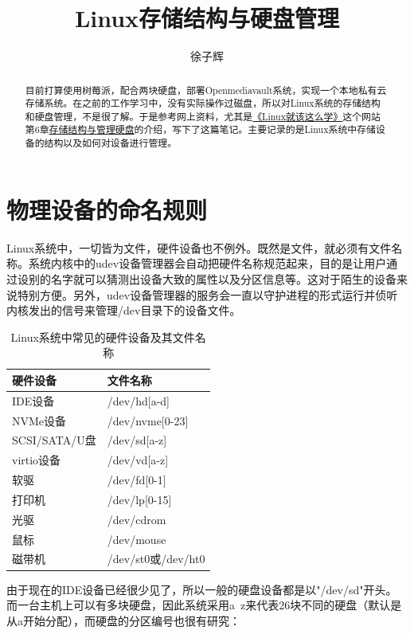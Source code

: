 \documentclass[UTF8]{article}
\title{Linux存储结构与硬盘管理}
\author{徐子辉}
\begin{document}
	\maketitle
	
	\begin{abstract}
		目前打算使用树莓派，配合两块硬盘，部署Openmediavault系统，实现一个本地私有云存储系统。在之前的工作学习中，没有实际操作过磁盘，所以对Linux系统的存储结构和硬盘管理，不是很了解。于是参考网上资料，尤其是\href{https://www.linuxprobe.com/}{《Linux就该这么学》}这个网站第6章\href{https://www.linuxprobe.com/basic-learning-06.html}{存储结构与管理硬盘}的介绍，写下了这篇笔记。主要记录的是Linux系统中存储设备的结构以及如何对设备进行管理。
	\end{abstract}
	
	
	\section{物理设备的命名规则}
	
	Linux系统中，一切皆为文件，硬件设备也不例外。既然是文件，就必须有文件名称。系统内核中的udev设备管理器会自动把硬件名称规范起来，目的是让用户通过设别的名字就可以猜测出设备大致的属性以及分区信息等。这对于陌生的设备来说特别方便。另外，udev设备管理器的服务会一直以守护进程的形式运行并侦听内核发出的信号来管理/dev目录下的设备文件。
	
	
	\begin{table}[H]
		\centering
		\caption{Linux系统中常见的硬件设备及其文件名称}
		\begin{tabular}{ll}
			\hline
			硬件设备 & 文件名称 \\ 
			\hline
			IDE设备 & /dev/hd[a-d] \\ 
			NVMe设备 & /dev/nvme[0-23] \\
			SCSI/SATA/U盘 & /dev/sd[a-z] \\
			virtio设备 & /dev/vd[a-z] \\
			软驱 & /dev/fd[0-1] \\
			打印机 & /dev/lp[0-15] \\
			光驱 & /dev/cdrom \\
			鼠标 & /dev/mouse \\
			磁带机 & /dev/st0或/dev/ht0 \\
			\hline
			
		\end{tabular}
	\end{table}
	
	
	由于现在的IDE设备已经很少见了，所以一般的硬盘设备都是以"/dev/sd"开头。而一台主机上可以有多块硬盘，因此系统采用a~z来代表26块不同的硬盘（默认是从a开始分配），而硬盘的分区编号也很有研究：
	
\end{document}
